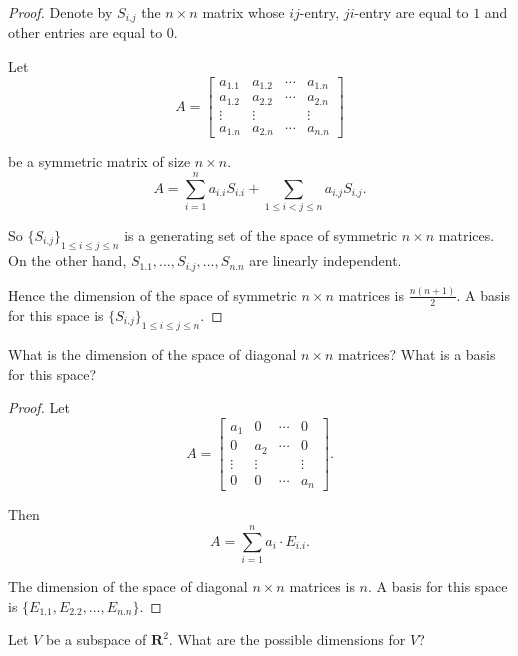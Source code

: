 \begin{proof}
    Denote by $S_{i.j}$ the $n\times n$ matrix whose $ij$-entry, $ji$-entry are equal to $1$ and other entries are equal to $0$.

    Let
    \[
        A = \begin{bmatrix}
            a_{1.1} & a_{1.2} & \cdots & a_{1.n} \\
            a_{1.2} & a_{2.2} & \cdots & a_{2.n} \\
            \vdots  & \vdots  &        & \vdots  \\
            a_{1.n} & a_{2.n} & \cdots & a_{n.n}
        \end{bmatrix}
    \]

    be a symmetric matrix of size $n\times n$.
    \[
        A = \sum^{n}_{i=1}a_{i.i}S_{i.i} + \sum_{1\le i < j \le n}a_{i.j}S_{i.j}.
    \]

    So ${\{ S_{i.j} \}}_{1\le i\le j\le n}$ is a generating set of the space of symmetric $n\times n$ matrices. On the other hand, $S_{1.1}, \ldots, S_{i.j}, \ldots, S_{n.n}$ are linearly independent.

    Hence the dimension of the space of symmetric $n\times n$ matrices is $\frac{n(n+1)}{2}$. A basis for this space is ${\{ S_{i.j} \}}_{1\le i\le j\le n}$.
\end{proof}

\begin{exercise}
    What is the dimension of the space of diagonal $n\times n$ matrices? What is a basis for this space?
\end{exercise}

\begin{proof}
    Let
    \[
        A = \begin{bmatrix}
            a_{1}  & 0      & \cdots & 0      \\
            0      & a_{2}  & \cdots & 0      \\
            \vdots & \vdots &        & \vdots \\
            0      & 0      & \cdots & a_{n}
        \end{bmatrix}.
    \]

    Then
    \[
        A = \sum^{n}_{i=1}a_{i}\cdot E_{i.i}.
    \]

    The dimension of the space of diagonal $n\times n$ matrices is $n$. A basis for this space is $\{ E_{1.1}, E_{2.2}, \ldots, E_{n.n} \}$.
\end{proof}

\begin{exercise}
    Let $V$ be a subspace of $\mathbf{R}^{2}$. What are the possible dimensions for $V$?
\end{exercise}


